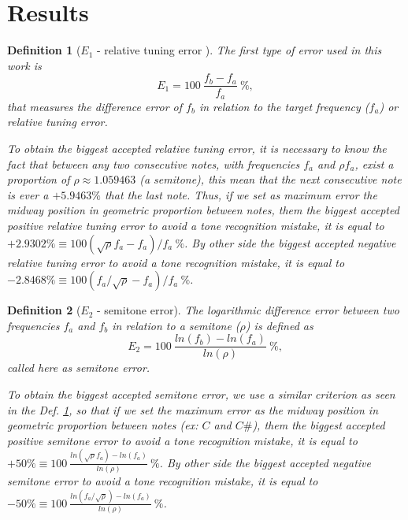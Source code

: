 \documentclass[11pt,twocolumn]{article}
\newtheorem{mydef}{Definition}[section]
\begin{document}
\section{Results}

\begin{mydef}[$E_1$ - relative tuning error ]
\label{def:max:E1}
The first type of error used in this work is 
\begin{equation}
E_1=100~\frac{f_b-f_a}{f_a}~\%,
\end{equation} 
that measures the difference error of $f_b$ in relation to the target frequency ($f_a$) or relative tuning error.


To obtain the biggest accepted relative tuning error,
it is necessary to know the fact that between any two consecutive notes, with frequencies
$f_a$ and $\rho f_a$, exist a proportion of $\rho\approx 1.059463$ (a semitone), this mean
that the next consecutive note is ever a $+5.9463\%$ that the last note. Thus, 
if we set as maximum error the midway position in geometric proportion between notes, them 
the biggest accepted positive relative tuning error 
to avoid a tone recognition mistake, it is equal to $+2.9302\% \equiv 100 (\sqrt{\rho}f_a-f_a)/f_a~\%$.
By other side 
the biggest accepted negative relative tuning error 
to avoid a tone recognition mistake, it is equal to $-2.8468\% \equiv 100 (f_a/\sqrt{\rho}-f_a)/f_a~\%$.

\end{mydef}

\begin{mydef}[$E_2$ - semitone error]
\label{def:max:E2}
The logarithmic difference error between two frequencies $f_a$ and $f_b$ in relation to a semitone ($\rho$) is
defined as
\begin{equation}
E_2=100~\frac{ln(f_b)-ln(f_a)}{ln(\rho)}~\%, 
\end{equation}
called here as semitone error.


To obtain the biggest accepted semitone error,
we use a similar criterion as seen in the Def. \ref{def:max:E1},
so that 
if we set the maximum error as the midway position in geometric proportion between notes (ex: $C$ and $C\#$), them 
the biggest accepted positive semitone error 
to avoid a tone recognition mistake, it is equal to $+50\% \equiv 100~\frac{ln(\sqrt{\rho} f_a)-ln(f_a)}{ln(\rho)}~\%  $.
By other side 
the biggest accepted negative semitone error 
to avoid a tone recognition mistake, it is equal to $-50\% \equiv 100~\frac{ln( f_a/\sqrt{\rho})-ln(f_a)}{ln(\rho)}~\%  $.
\end{mydef}
\end{document}
